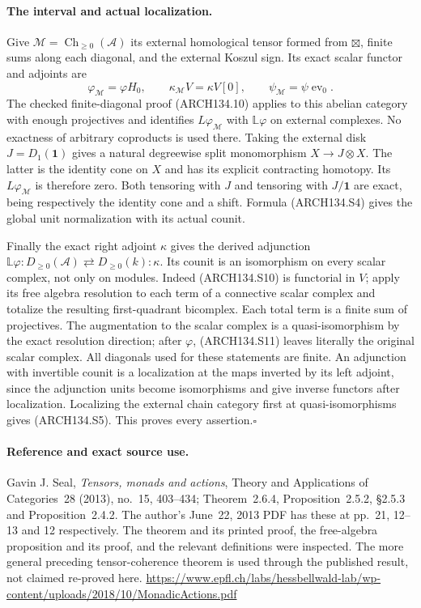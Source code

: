 \paragraph{The interval and actual localization.}
Give $\mathcal M=\operatorname{Ch}_{\ge0}(\mathcal A)$ its
external homological tensor formed from $\boxtimes$, finite
sums along each diagonal, and the external Koszul sign.
Its exact scalar functor and adjoints are
\[
 \varphi_{\mathcal M}=\varphi H_0,
 \qquad \kappa_{\mathcal M}V=\kappa V[0],
 \qquad \psi_{\mathcal M}=\psi\operatorname{ev}_0.
 \tag{ARCH134.S12}
\]
The checked finite-diagonal proof (ARCH134.10) applies to this
abelian category with enough projectives and identifies
$L\varphi_{\mathcal M}$ with $\mathbb L\varphi$ on external
complexes.  No exactness of arbitrary coproducts is used there.
Taking the external disk $J=D_1(\mathbf1)$ gives a natural
degreewise split monomorphism $X\to J\otimes X$.
The latter is the identity cone on $X$ and has its explicit
contracting homotopy.  Its $L\varphi_{\mathcal M}$ is therefore
zero.  Both tensoring with $J$ and tensoring with
$J/\mathbf1$ are exact, being respectively the identity cone
and a shift.  Formula (ARCH134.S4) gives the global unit
normalization with its actual counit.

Finally the exact right adjoint $\kappa$ gives the derived
adjunction
$\mathbb L\varphi:D_{\ge0}(\mathcal A)
\rightleftarrows D_{\ge0}(k):\kappa$.
Its counit is an isomorphism on every scalar complex, not only
on modules.  Indeed (ARCH134.S10) is functorial in $V$;
apply its free algebra resolution to each term of a connective
scalar complex and totalize the resulting first-quadrant
bicomplex.  Each total term is a finite sum of projectives.
The augmentation to the scalar complex is a quasi-isomorphism
by the exact resolution direction; after $\varphi$,
(ARCH134.S11) leaves literally the original scalar complex.
All diagonals used for these statements are finite.
An adjunction with invertible counit is a localization at the
maps inverted by its left adjoint, since the adjunction units
become isomorphisms and give inverse functors after localization.
Localizing the external chain category first at
quasi-isomorphisms gives (ARCH134.S5).  This proves every
assertion.\hfill$\square$

\paragraph{Reference and exact source use.}
Gavin J. Seal, \emph{Tensors, monads and actions},
Theory and Applications of Categories~28 (2013), no.~15,
403--434; Theorem~2.6.4, Proposition~2.5.2, \S2.5.3 and
Proposition~2.4.2.  The author's June~22, 2013 PDF has these
at pp.~21, 12--13 and 12 respectively.  The theorem and its
printed proof, the free-algebra proposition and its proof,
and the relevant definitions were inspected.  The more general
preceding tensor-coherence theorem is used through the
published result, not claimed re-proved here.
\url{https://www.epfl.ch/labs/hessbellwald-lab/wp-content/uploads/2018/10/MonadicActions.pdf}

